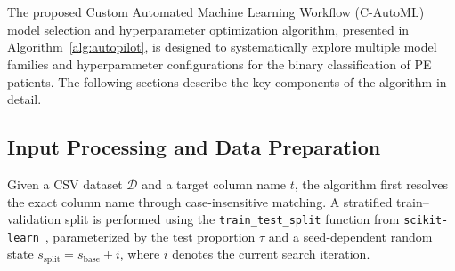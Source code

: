 \documentclass[diagnostics,article,accept,pdftex,moreauthors]{Definitions/mdpi}
\begin{document}
\appendixstart
\appendix
\section[\appendixname~\thesection]{}
\label{app:c-automl}
The proposed Custom Automated Machine Learning {Workflow}
(\ac{C-AutoML}) %
model selection and hyperparameter optimization algorithm, presented
in Algorithm~\ref{alg:autopilot}, is designed to systematically
explore multiple model families and hyperparameter configurations for
the binary classification of \ac{PE} patients. The following sections
describe the key components of the algorithm in detail.


\subsection[\appendixname~\thesubsection]{Input Processing and Data Preparation}


Given a CSV dataset $\mathcal{D}$ and a target column name $t$, the
algorithm first resolves the exact column name through
case-insensitive matching. A stratified train--validation split is
performed using the \texttt{train\_test\_split} function from
\texttt{scikit-learn}~\cite{sklearn-api}, parameterized by the test
proportion $\tau$ and a seed-dependent random state
$s_{\text{split}} = s_{\text{base}} + i$, where $i$ denotes the
current search iteration.
\end{document}

